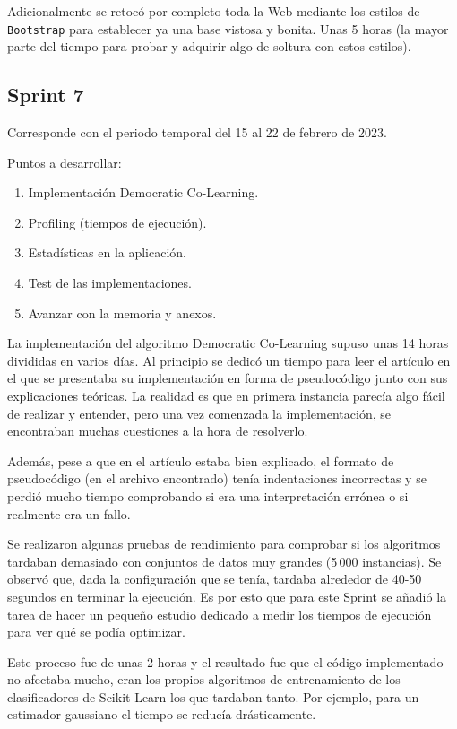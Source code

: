 Adicionalmente se retocó por completo toda la Web mediante los estilos de
\texttt{Bootstrap} para establecer ya una base vistosa y bonita. Unas 5 horas
(la mayor parte del tiempo para probar y adquirir algo de soltura con estos
estilos).

\subsection{Sprint 7}
Corresponde con el periodo temporal del 15 al 22 de febrero de 2023.

Puntos a desarrollar:
\begin{enumerate}
    \item Implementación Democratic Co-Learning.
    \item Profiling (tiempos de ejecución).
    \item Estadísticas en la aplicación.
    \item Test de las implementaciones.
    \item Avanzar con la memoria y anexos.
\end{enumerate}

La implementación del algoritmo Democratic Co-Learning supuso unas 14 horas
divididas en varios días. Al principio se dedicó un tiempo para leer el artículo
en el que se presentaba su implementación en forma de pseudocódigo junto con sus
explicaciones teóricas. La realidad es que en primera instancia parecía algo
fácil de realizar y entender, pero una vez comenzada la implementación, se
encontraban muchas cuestiones a la hora de resolverlo. 

Además, pese a que en el artículo estaba bien explicado, el formato de
pseudocódigo (en el archivo encontrado) tenía indentaciones incorrectas y se
perdió mucho tiempo comprobando si era una interpretación errónea o si realmente
era un fallo.

Se realizaron algunas pruebas de rendimiento para comprobar si los algoritmos
tardaban demasiado con conjuntos de datos muy grandes (5\,000 instancias). Se
observó que, dada la configuración que se tenía, tardaba alrededor de 40-50
segundos en terminar la ejecución. Es por esto que para este Sprint se añadió la
tarea de hacer un pequeño estudio dedicado a medir los tiempos de ejecución para
ver qué se podía optimizar. 

Este proceso fue de unas 2 horas y el resultado fue que el código implementado
no afectaba mucho, eran los propios algoritmos de entrenamiento de los
clasificadores de Scikit-Learn los que tardaban tanto. Por ejemplo, para un
estimador gaussiano el tiempo se reducía drásticamente.

